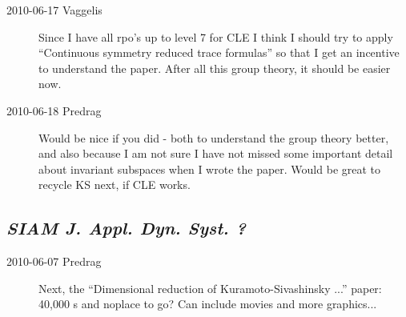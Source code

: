 \begin{description}
 \item[2010-06-17 Vaggelis]
Since I have all rpo's up to level 7 for CLE I think I should try
to apply ``Continuous symmetry reduced trace formulas'' so that I get an incentive
to understand the paper. After all this group theory, it should be easier now.
 \item[2010-06-18 Predrag]
Would be nice if you did - both to understand the group theory better, and
also because I am not sure I have not missed some important detail about
invariant subspaces when I wrote the paper. Would be great to recycle KS
next, if CLE works.
\end{description}


\subsection{\emph{SIAM J. Appl. Dyn. Syst. ?}}

\begin{description}

\item[2010-06-07 Predrag] Next, the
``Dimensional reduction of Kuramoto-Sivashinsky ...'' paper:
40,000 \rpo s and noplace to go?
Can include movies and more graphics...

\end{description}
